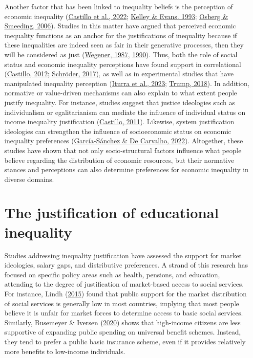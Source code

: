 \documentclass[
  12pt,
  a4paper,
]{article}
\begin{document}
Another factor that has been linked to inequality beliefs is the
perception of economic inequality
(\protect\hyperlink{ref-castillo_perception_2022}{Castillo et al.,
2022};
\protect\hyperlink{ref-kelleyLegitimationInequalityOccupational1993}{Kelley
\& Evans, 1993}; \protect\hyperlink{ref-osberg_fair_2006}{Osberg \&
Smeeding, 2006}). Studies in this matter have argued that perceived
economic inequality functions as an anchor for the justifications of
inequality because if these inequalities are indeed seen as fair in
their generative processes, then they will be considered as just
(\protect\hyperlink{ref-wegenerIllusionDistributiveJustice1987}{Wegener,
1987}, \protect\hyperlink{ref-Wegener1990}{1990}). Thus, both the role
of social status and economic inequality perceptions have found support
in correlational
(\protect\hyperlink{ref-Castillo2012a_justice}{Castillo, 2012};
\protect\hyperlink{ref-schroder_income_2017}{Schröder, 2017}), as well
as in experimental studies that have manipulated inequality perception
(\protect\hyperlink{ref-iturra_percepcion_2023}{Iturra et al., 2023};
\protect\hyperlink{ref-trump_income_2018}{Trump, 2018}). In addition,
normative or value-driven mechanisms can also explain to what extent
people justify inequality. For instance, studies suggest that justice
ideologies such as individualism or egalitarianism can mediate the
influence of individual status on income inequality justification
(\protect\hyperlink{ref-Castillo2011}{Castillo, 2011}). Likewise, system
justification ideologies can strengthen the influence of socioeconomic
status on economic inequality preferences
(\protect\hyperlink{ref-garcia-sanchez_creencias_2022}{García-Sánchez \&
De Carvalho, 2022}). Altogether, these studies have shown that not only
socio-structural factors influence what people believe regarding the
distribution of economic resources, but their normative stances and
perceptions can also determine preferences for economic inequality in
diverse domains.

\hypertarget{the-justification-of-educational-inequality}{%
\section{The justification of educational
inequality}\label{the-justification-of-educational-inequality}}

Studies addressing inequality justification have assessed the support
for market ideologies, salary gaps, and distributive preferences. A
strand of this research has focused on specific policy areas such as
health, pensions, and education, attending to the degree of
justification of market-based access to social services. For instance,
Lindh (\protect\hyperlink{ref-lindhPublicOpinionMarkets2015}{2015})
found that public support for the market distribution of social services
is generally low in most countries, implying that most people believe it
is unfair for market forces to determine access to basic social
services. Similarly, Busemeyer \& Iversen
(\protect\hyperlink{ref-busemeyer_welfare_2020}{2020}) shows that
high-income citizens are less supportive of expanding public spending on
universal benefit schemes. Instead, they tend to prefer a public basic
insurance scheme, even if it provides relatively more benefits to
low-income individuals.
\end{document}
